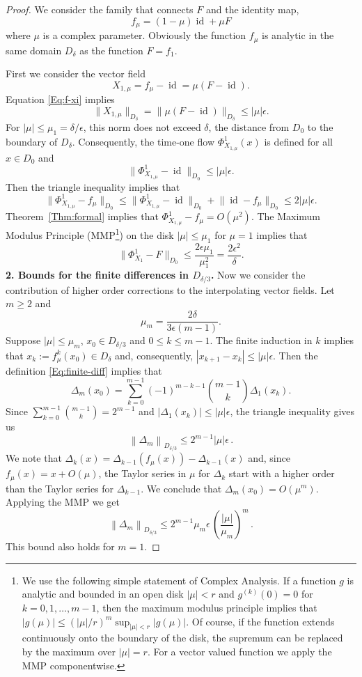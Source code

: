 \documentclass[10pt,a4paper]{amsart}
\begin{document}
\begin{proof}
We consider the family that connects $F$ and the identity map,
\[
f_\mu=(1-\mu)\operatorname{id} +\mu F
\]
where $\mu$ is a complex parameter.  
Obviously the  function $f_\mu$ is analytic in the same domain $D_\delta$ as the function $F=f_1$.

 First we consider the
 vector field 
\[
X_{1,\mu}=f_\mu -\operatorname{id} =\mu(F-\operatorname{id} ).
\] 
Equation \eqref{Eq:f-xi} implies
\[\|X_{1,\mu}\|_{D_{\delta}}=\|\mu(F-\operatorname{id} )\|_{D_{\delta}}\le |\mu|\epsilon.
\]
For $|\mu|\le\mu_1=\delta/\epsilon$, this norm does not exceed $\delta$, the distance from
$D_0$ to the boundary of $D_\delta$. Consequently,
the time-one flow $\Phi^1_{X_{1,\mu}}(x)$ is defined 
for all $x\in D_0$ and 
\[\bigl\|\Phi^1_{X_{1,\mu}}-\operatorname{id} \bigr\|_{D_0}
\le |\mu|\epsilon.
\]
Then the triangle inequality implies that
\[
\bigl\|\Phi^1_{X_{1,\mu}}-f_\mu \bigr\|_{D_0}\le 
\bigl\|\Phi^1_{X_{1,\mu}}-\operatorname{id} \bigr\|_{D_0}+\bigl\|\operatorname{id} -f_\mu \bigr\|_{D_0}
\le 2 |\mu|\epsilon. \]
 Theorem~\ref{Thm:formal} implies that $\Phi^1_{X_{1,\mu}}-f_\mu=O(\mu^2)$. The Maximum Modulus Principle (MMP\footnote{We  use the following simple statement of Complex Analysis.
 If a function $g$ is analytic and bounded in an open disk   $|\mu|<r$ and $g^{(k)}(0)=0$ for $k=0,1,\ldots,m-1$,
 then  the maximum modulus principle implies that 
 $|g(\mu )|\le \left(|\mu|/r\right)^{m} \sup_{|\mu|< r} |g(\mu )|$.
 Of course, if the function  extends continuously onto the boundary of the disk,
 the supremum can be replaced by the maximum over $|\mu|=r$. For a vector valued function
 we apply the MMP componentwise.})
 on the disk $|\mu|\le\mu_1$ for $\mu=1$ implies that
\[
\bigl\|\Phi^1_{X_{1}}-F \bigr\|_{D_0}  
\le   \frac{ 2\epsilon\mu_1}{\mu_1^{2}}
=
 \frac{2\epsilon^2 }{\delta}.
\]
{\bf 2. Bounds for the finite differences in $D_{\delta/3}$.}
Now we consider the contribution of higher order corrections to the interpolating
vector fields.
Let $m\ge 2$ and
\[
\mu_m=\frac{2\delta}{3\epsilon (m-1)}.
\]
Suppose $|\mu|\le \mu_m$, $x_0\in D_{\delta/3}$ and $0\le k\le m-1$.
The finite induction in $k$ implies that $x_k:=f_\mu^k(x_0)\in D_{\delta}$ 
and, consequently, $|x_{k+1}-x_k|\le |\mu|\epsilon $. 
Then the definition \eqref{Eq:finite-diff}
implies that 
\[
    \Delta_{m}(x_0)=\sum_{k=0}^{m-1} (-1)^{m-k-1} \binom{m-1}{k}\Delta_1(x_k).
\]
Since $\sum_{k=0}^{m-1}\binom{m-1}{k}=2^{m-1}$ and $|\Delta_1(x_k)|\le |\mu|\epsilon$, the triangle inequality gives us
\[
	\left\| \Delta_{m}\right\|_{D_{\delta/3}}
	\le  
	2^{m-1}|\mu|\epsilon\,.
\]
We note that  $\Delta_k(x)=\Delta_{k-1}(f_\mu(x))-\Delta_{k-1}(x)$
and, since $f_\mu(x)=x+O(\mu)$, the Taylor series in $\mu$ for $\Delta_k$ start
with a higher order than the Taylor series for $\Delta_{k-1}$.
We conclude that   $\Delta_{m}(x_0)=O(\mu^{m})$.
Applying the MMP we get 
\[
\left\|\Delta_{m}\right\|_{D_{\delta/3}}
\le
2^{m-1}\mu_{m}\epsilon \,
\left(\frac{|\mu|}{\mu_{m}}\right)^{m} \,. 
\]
This bound also holds for $m=1$.


\end{proof}
\end{document}
